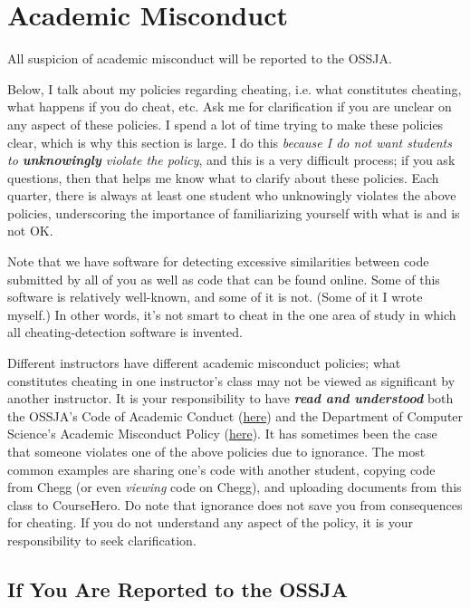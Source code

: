 \documentclass{article}
\begin{document}
\section{Academic Misconduct}

All suspicion of academic misconduct will be reported to the OSSJA.

Below, I talk about my policies regarding cheating, i.e. what constitutes cheating, what happens if you do cheat, etc. Ask me for clarification if you are unclear on any aspect of these policies. I spend a lot of time trying to make these policies clear, which is why this section is large. I do this \textit{because I do not want students to \textbf{unknowingly} violate the policy}, and this is a very difficult process; if you ask questions, then that helps me know what to clarify about these policies. Each quarter, there is always at least one student who unknowingly violates the above policies, underscoring the importance of familiarizing yourself with what is and is not OK.

Note that we have software for detecting excessive similarities between code submitted by all of you as well as code that can be found online. Some of this software is relatively well-known, and some of it is not. (Some of it I wrote myself.) In other words, it's not smart to cheat in the one area of study in which all cheating-detection software is invented.

Different instructors have different academic misconduct policies; what constitutes cheating in one instructor's class may not be viewed as significant by another instructor. It is your responsibility to have \textbf{\textit{read and understood}} both the OSSJA's Code of Academic Conduct (\href{https://supportjudicialaffairs.sf.ucdavis.edu/code-academic-conduct}{here}) and the Department of Computer Science's Academic Misconduct Policy (\href{https://cs.ucdavis.edu/undergraduate/current-majors/policies}{here}). It has sometimes been the case that someone violates one of the above policies due to ignorance. The most common examples are sharing one's code with another student, copying code from Chegg (or even \textit{viewing} code on Chegg), and uploading documents from this class to CourseHero. Do note that ignorance does not save you from consequences for cheating. If you do not understand any aspect of the policy, it is your responsibility to seek clarification.

\subsection{If You Are Reported to the OSSJA}
\end{document}
